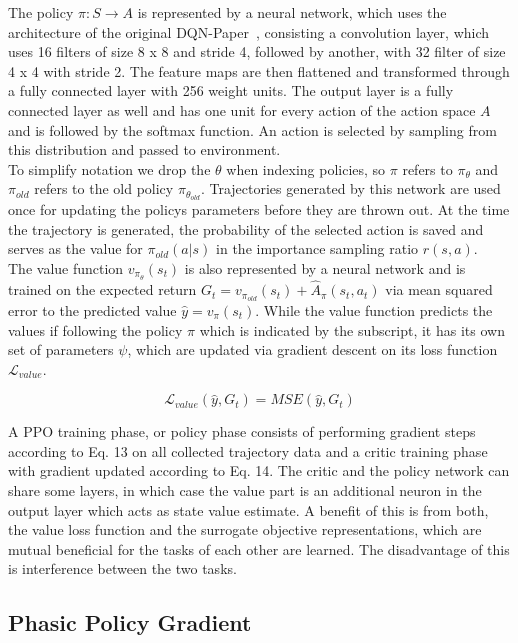 \documentclass{article}
\begin{document}
\noindent The policy $\pi : S \xrightarrow{} A$ is represented by a neural network, which uses
the architecture of the original DQN-Paper~\cite{DBLP:journals/corr/MnihKSGAWR13}, consisting 
a convolution layer, which uses 16 filters of size 8 x 8 and stride 4,
followed by another, with 32 filter of size 4 x 4 with stride 2. The feature maps are then
flattened and transformed through a fully connected layer with 256 weight units.
The output layer is a fully connected layer as well and has one unit for every
action of the action space $A$ and is followed by the softmax function. 
An action is selected by sampling from this distribution and passed to environment.\\
To simplify notation we drop the $\theta$ when indexing policies, so $\pi$ refers to $\pi_\theta$ and
$\pi_{old}$ refers to the old policy $\pi_{\theta_{old}}$.
Trajectories generated by this network are used once for updating the policys
parameters before they are thrown out. At the time the trajectory is generated,
the probability of the selected action is saved and serves as the value for
$\pi_{old}(a|s)$ in the importance sampling ratio $r(s,a)$.\\
The value function $v_{\pi_\theta}(s_t)$ is also represented by a neural network and
is trained on the expected return $G_t = v_{\pi_{old}}(s_t) + \hat A_\pi(s_t,a_t)$
via mean squared error to the predicted value $\hat y = v_\pi(s_t)$. 
While the value function predicts the values if following the policy $\pi$ which is
indicated by the subscript, it has its own set of parameters $\psi$, which are updated
via gradient descent on its loss function $\mathcal{L}_{value}$.

\begin{equation}
    \mathcal{L}_{value}(\hat y, G_t) = MSE(\hat y, G_t)
\end{equation}

\noindent A PPO training phase, or policy phase consists of performing gradient steps according to Eq. 13
on all collected trajectory data and a critic training phase with gradient updated according to Eq. 14.
The critic and the policy network can share some layers, in
which case the value part is an additional neuron in the output layer
which acts as state value estimate. A benefit of this is from both,
the value loss function and the surrogate objective representations, which are mutual
beneficial for the tasks of each other are learned. The disadvantage of this is interference between
the two tasks.

\subsection{Phasic Policy Gradient}
\end{document}
